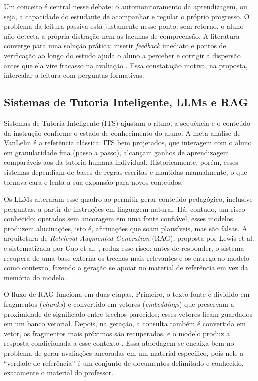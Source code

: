 \documentclass[12pt,a4paper]{article}
\begin{document}
Um conceito é central nesse debate: o automonitoramento da aprendizagem, ou seja, a capacidade do estudante de acompanhar e regular o próprio progresso. O problema da leitura passiva está justamente nesse ponto: sem retorno, o aluno não detecta a própria distração nem as lacunas de compreensão. A literatura converge para uma solução prática: inserir \emph{feedback} imediato e pontos de verificação ao longo do estudo ajuda o aluno a perceber e corrigir a dispersão antes que ela vire fracasso na avaliação \cite{DDD17,Van11}. Essa constatação motiva, na proposta, intercalar a leitura com perguntas formativas.

\subsection{Sistemas de Tutoria Inteligente, LLMs e RAG}\label{sub:its}

Sistemas de Tutoria Inteligente (ITS) ajustam o ritmo, a sequência e o conteúdo da instrução conforme o estado de conhecimento do aluno. A meta-análise de VanLehn \cite{Van11} é a referência clássica: ITS bem projetados, que interagem com o aluno em granularidade fina (passo a passo), alcançam ganhos de aprendizagem comparáveis aos da tutoria humana individual. Historicamente, porém, esses sistemas dependiam de bases de regras escritas e mantidas manualmente, o que tornava cara e lenta a sua expansão para novos conteúdos.

Os LLMs \cite{BMR20,ZZL23} alteraram esse quadro ao permitir gerar conteúdo pedagógico, inclusive perguntas, a partir de instruções em linguagem natural. Há, contudo, um risco conhecido: operados sem ancoragem em uma fonte confiável, esses modelos produzem alucinações, isto é, afirmações que soam plausíveis, mas são falsas. A arquitetura de \emph{Retrieval-Augmented Generation} (RAG), proposta por Lewis et al. \cite{LPP20} e sistematizada por Gao et al. \cite{GXG23}, reduz esse risco: antes de responder, o sistema recupera de uma base externa os trechos mais relevantes e os entrega ao modelo como contexto, fazendo a geração se apoiar no material de referência em vez da memória do modelo.

O fluxo de RAG funciona em duas etapas. Primeiro, o texto-fonte é dividido em fragmentos (\emph{chunks}) e convertido em vetores (\emph{embeddings}) que preservam a proximidade de significado entre trechos parecidos; esses vetores ficam guardados em um banco vetorial. Depois, na geração, a consulta também é convertida em vetor, os fragmentos mais próximos são recuperados, e o modelo produz a resposta condicionada a esse contexto \cite{GXG23}. Essa abordagem se encaixa bem no problema de gerar avaliações ancoradas em um material específico, pois nele a ``verdade de referência'' é um conjunto de documentos delimitado e conhecido, exatamente o material do professor.
\end{document}
